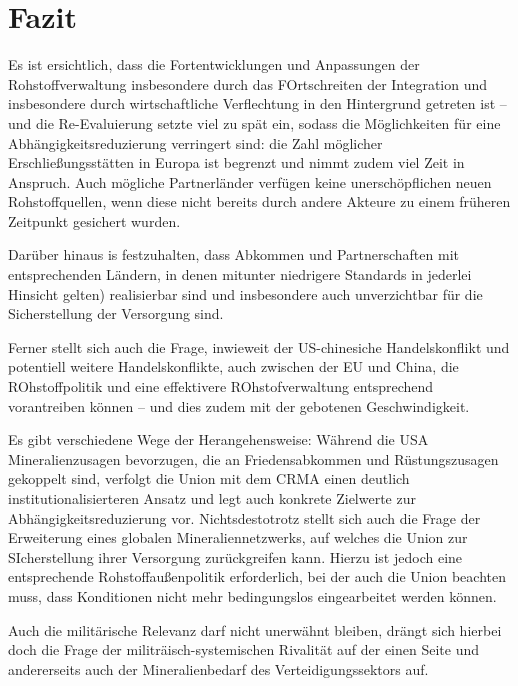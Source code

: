 \documentclass[12pt,a4paper,oneside]{book} %
\begin{document}
\section{Fazit}

Es ist ersichtlich, dass die Fortentwicklungen und Anpassungen der Rohstoffverwaltung insbesondere durch das FOrtschreiten der Integration und insbesondere durch wirtschaftliche Verflechtung in den Hintergrund getreten ist -- und die Re-Evaluierung setzte viel zu spät ein, sodass die Möglichkeiten für eine Abhängigkeitsreduzierung verringert sind: die Zahl möglicher Erschließungsstätten in Europa ist begrenzt und nimmt zudem viel Zeit in Anspruch. Auch mögliche Partnerländer verfügen keine unerschöpflichen neuen Rohstoffquellen, wenn diese nicht bereits durch andere Akteure zu einem früheren Zeitpunkt gesichert wurden.

Darüber hinaus is festzuhalten, dass Abkommen und Partnerschaften mit entsprechenden Ländern, in denen mitunter niedrigere Standards in jederlei Hinsicht gelten) realisierbar sind und insbesondere auch unverzichtbar für die Sicherstellung der Versorgung sind.

Ferner stellt sich auch die Frage, inwieweit der US-chinesiche Handelskonflikt und potentiell weitere Handelskonflikte, auch zwischen der EU und China, die ROhstoffpolitik und eine effektivere ROhstofverwaltung entsprechend vorantreiben können -- und dies zudem mit der gebotenen Geschwindigkeit.

Es gibt verschiedene Wege der Herangehensweise: Während die USA Mineralienzusagen bevorzugen, die an Friedensabkommen und Rüstungszusagen gekoppelt sind, verfolgt die Union mit dem CRMA einen deutlich institutionalisierteren Ansatz und legt auch konkrete Zielwerte zur Abhängigkeitsreduzierung vor. Nichtsdestotrotz stellt sich auch die Frage der Erweiterung eines globalen Mineraliennetzwerks, auf welches die Union zur SIcherstellung ihrer Versorgung zurückgreifen kann. Hierzu ist jedoch eine entsprechende Rohstoffaußenpolitik erforderlich, bei der auch die Union beachten muss, dass Konditionen nicht mehr bedingungslos eingearbeitet werden können. 

Auch die militärische Relevanz darf nicht unerwähnt bleiben, drängt sich hierbei doch die Frage der militräisch-systemischen Rivalität auf der einen Seite und andererseits auch der Mineralienbedarf des Verteidigungssektors auf.

	
\end{document}
